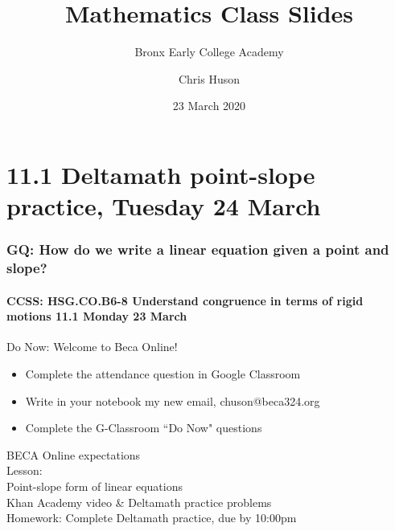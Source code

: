 \documentclass{beamer}
\title{Mathematics Class Slides}
\subtitle{Bronx Early College Academy}
\author{Chris Huson}
\date{23 March 2020}
\begin{document}
\frame{\titlepage}
\section[Outline]{}
\frame{\tableofcontents}

\section{11.1 Deltamath point-slope practice, Tuesday 24 March} 
\frame
{
  \frametitle{GQ: How do we write a linear equation given a point and slope?}
  \framesubtitle{CCSS: HSG.CO.B6-8 Understand congruence in terms of rigid motions \hfill \alert{11.1 Monday 23 March}}

  \begin{block}{Do Now: Welcome to Beca Online!}
    \begin{itemize}
      \item Complete the attendance question in Google Classroom
      \item Write in your notebook my new email, chuson@beca324.org
      \item Complete the G-Classroom ``Do Now" questions
    \end{itemize}

    \end{block}
    BECA Online expectations \\[0.25cm]
    Lesson: \\
    Point-slope form of linear equations \\
    Khan Academy video \& Deltamath practice problems  \\
    Homework: Complete Deltamath practice, due by 10:00pm
}
\end{document}
